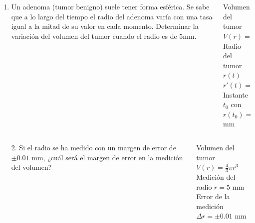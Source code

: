 \documentclass[aspectratio=169,10pt,t]{beamer}
\begin{document}
\begin{frame}
\begin{columns}
\begin{column}[T]{0.6\textwidth}
\begin{enumerate}
\item Un adenoma (tumor benigno) suele tener forma esférica.
Se sabe que a lo largo del tiempo el radio del adenoma varía con una tasa igual a la mitad de su valor en cada momento.
Determinar la variación del volumen del tumor cuando el radio es de 5mm. 
\end{enumerate}
\end{column}
\begin{column}[T]{0.4\textwidth}
\begin{datos}
Volumen del tumor $V(r)=\frac{4}{3}\pi r^3$\\
Radio del tumor $r(t)$\\
$r'(t)=r/2$\\
Instante $t_0$ con $r(t_0)=5$ mm
\end{datos}
\end{column}
\end{columns}
\end{frame}


\begin{frame}
\begin{columns}
\begin{column}[T]{0.6\textwidth}
\begin{enumerate}
\item[2.] Si el radio se ha medido con un margen de error de $\pm 0.01$ mm, ¿cuál será el margen de error en la medición del volumen?
\end{enumerate}
\end{column}
\begin{column}[T]{0.4\textwidth}
\begin{datos}
Volumen del tumor $V(r)=\frac{4}{3}\pi r^3$\\
Medición del radio $r=5$ mm\\
Error de la medición $\Delta r=\pm 0.01$ mm
\end{datos}
\end{column}
\end{columns}
\end{frame}
\end{document}

